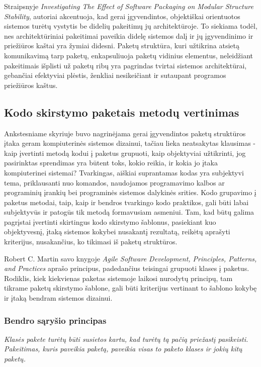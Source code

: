 Straipsnyje \textit{Investigating The Effect of Software Packaging on Modular Structure Stability}, autoriai akcentuoja, kad
gerai įgyvendintos, objektiškai orientuotos sistemos turėtų vystytis be didelių pakeitimų jų architektūroje.
To siekiama todėl, nes architektūriniai pakeitimai paveikia didelę sistemos dalį ir
jų įgyvendinimo ir priežiūros kaštai yra žymiai didesni\cite{ModularStability}.
Paketų struktūra, kuri užtikrina atsietą  komunikavimą tarp paketų, enkapsuliuoja paketų vidinius elementus, neleidžiant pakeitimais
išplisti už paketų ribų yra pagrindas tvirtai sistemos architektūrai, gebančiai efektyviai plėstis, ženkliai nesikeičiant ir sutaupant programos priežiūros kaštus.

\subsection{Kodo skirstymo paketais metodų vertinimas}
Ankstesniame skyriuje buvo nagrinėjama gerai įgyvendintos paketų struktūros įtaka geram kompiuterinės sistemos dizainui,
tačiau lieka neatsakytas klausimas - kaip įvertinti metodą kodui į paketus grupuoti, kaip objektyviai užtikrinti,
jog pasirinktas sprendimas yra būtent toks, kokio reikia, ir kokia jo įtaka kompiuterinei sistemai?
Tvarkingas, aiškiai suprantamas kodas yra subjektyvi tema, priklausanti nuo komandos,
naudojamos programavimo kalbos ar programinių įrankių bei programinės sistemos dalykinės srities.
Kodo grupavimo į paketus metodai, taip, kaip ir bendros tvarkingo kodo praktikos,
gali būti labai subjektyvūs ir patogūs tik metodą formavusiam asmeniui.
Tam, kad būtų galima pagrįstai įvertinti skirtingus kodo skirstymo šablonus, pasiekiant kuo objektyvesnį,
įtaką sistemos kokybei nusakantį rezultatą, reikėtų aprašyti kriterijus, nusakančius, ko tikimasi iš paketų struktūros.

Robert C. Martin savo knygoje \textit{Agile Software Development, Principles, Patterns, and Practices} aprašo
principus, padedančius teisingai grupuoti klases į paketus.
Rodiklis, kiek kiekvienas paketas sistemoje laikosi nurodytų principų, tam tikrame paketų skirstymo šablone, gali
būti kriterijus vertinant to šablono kokybę ir įtaką bendram sistemos dizainui.

\subsubsection{Bendro sąryšio principas}
\textit{Klasės pakete turėtų būti susietos kartu, kad turėtų tą pačią priežastį pasikeisti. Pakeitimas,
kuris paveikia paketą, paveikia visas to paketo klases ir jokių kitų paketų.}

